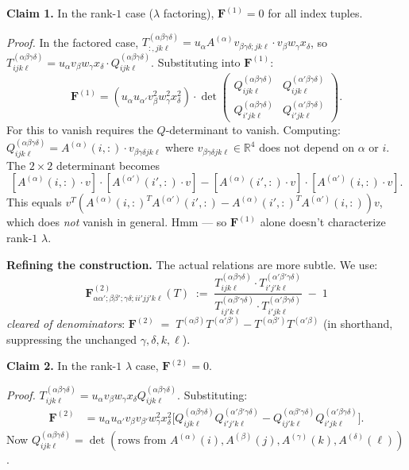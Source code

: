 \textbf{Claim 1.}  In the rank-$1$ case ($\lambda$ factoring), $\mathbf F^{(1)}=0$ for all index tuples.

\emph{Proof.}  In the factored case, $T^{(\alpha\beta\gamma\delta)}_{:,jk\ell}=u_\alpha A^{(\alpha)}v_{\beta\gamma\delta;jk\ell}\cdot v_\beta w_\gamma x_\delta$, so $T^{(\alpha\beta\gamma\delta)}_{ijk\ell}=u_\alpha v_\beta w_\gamma x_\delta\cdot Q^{(\alpha\beta\gamma\delta)}_{ijk\ell}$.  Substituting into $\mathbf F^{(1)}$:
\[
\mathbf F^{(1)} = (u_\alpha u_{\alpha'} v_\beta^2 w_\gamma^2 x_\delta^2) \cdot \det\begin{pmatrix}Q^{(\alpha\beta\gamma\delta)}_{ijk\ell}&Q^{(\alpha'\beta\gamma\delta)}_{ijk\ell}\\Q^{(\alpha\beta\gamma\delta)}_{i'jk\ell}&Q^{(\alpha'\beta\gamma\delta)}_{i'jk\ell}\end{pmatrix}.
\]
For this to vanish requires the $Q$-determinant to vanish.  Computing: $Q^{(\alpha\beta\gamma\delta)}_{ijk\ell}=A^{(\alpha)}(i,:)\cdot v_{\beta\gamma\delta jk\ell}$ where $v_{\beta\gamma\delta jk\ell}\in\mathbb R^4$ does not depend on $\alpha$ or $i$.  The $2\times 2$ determinant becomes
\[
[A^{(\alpha)}(i,:)\cdot v]\cdot[A^{(\alpha')}(i',:)\cdot v] - [A^{(\alpha)}(i',:)\cdot v]\cdot[A^{(\alpha')}(i,:)\cdot v].
\]
This equals $v^T(A^{(\alpha)}(i,:)^T A^{(\alpha')}(i',:)-A^{(\alpha)}(i',:)^T A^{(\alpha')}(i,:))v$, which does \emph{not} vanish in general.  Hmm — so $\mathbf F^{(1)}$ alone doesn't characterize rank-$1$ $\lambda$.

\medskip
\noindent\textbf{Refining the construction.}  The actual relations are more subtle.  We use:
\[
\mathbf F^{(2)}_{\alpha\alpha';\beta\beta';\gamma\delta;ii'jj'k\ell}(T) \;:=\;
\frac{T^{(\alpha\beta\gamma\delta)}_{ijk\ell}\cdot T^{(\alpha'\beta'\gamma\delta)}_{i'j'k\ell}}{T^{(\alpha\beta'\gamma\delta)}_{ij'k\ell}\cdot T^{(\alpha'\beta\gamma\delta)}_{i'jk\ell}} \;-\;1
\]
\emph{cleared of denominators}: $\mathbf F^{(2)}\;=\;T^{(\alpha\beta)}T^{(\alpha'\beta')} - T^{(\alpha\beta')}T^{(\alpha'\beta)}$ (in shorthand, suppressing the unchanged $\gamma,\delta,k,\ell$).

\textbf{Claim 2.}  In the rank-$1$ $\lambda$ case, $\mathbf F^{(2)}=0$.

\emph{Proof.}  $T^{(\alpha\beta\gamma\delta)}_{ijk\ell}=u_\alpha v_\beta w_\gamma x_\delta Q^{(\alpha\beta\gamma\delta)}_{ijk\ell}$.  Substituting:
\begin{align*}
\mathbf F^{(2)} &= u_\alpha u_{\alpha'} v_\beta v_{\beta'} w_\gamma^2 x_\delta^2\bigl[Q^{(\alpha\beta\gamma\delta)}_{ijk\ell} Q^{(\alpha'\beta'\gamma\delta)}_{i'j'k\ell}-Q^{(\alpha\beta'\gamma\delta)}_{ij'k\ell}Q^{(\alpha'\beta\gamma\delta)}_{i'jk\ell}\bigr].
\end{align*}
Now $Q^{(\alpha\beta\gamma\delta)}_{ijk\ell}=\det(\text{rows from }A^{(\alpha)}(i),A^{(\beta)}(j),A^{(\gamma)}(k),A^{(\delta)}(\ell))$.

